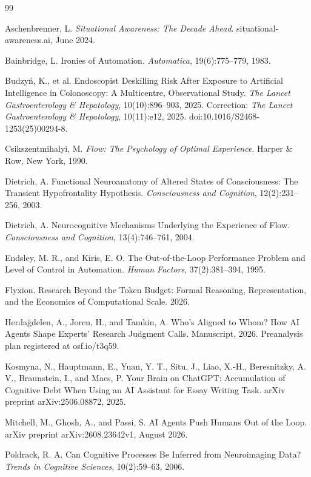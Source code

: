\documentclass[11pt]{article}
\begin{document}
\begin{thebibliography}{99}

 Aschenbrenner, L. \emph{Situational Awareness: The Decade Ahead}. situational-awareness.ai, June 2024.

 Bainbridge, L. Ironies of Automation. \emph{Automatica}, 19(6):775--779, 1983.

 Budzy\'n, K., et al. Endoscopist Deskilling Risk After Exposure to Artificial Intelligence in Colonoscopy: A Multicentre, Observational Study. \emph{The Lancet Gastroenterology \& Hepatology}, 10(10):896--903, 2025. Correction: \emph{The Lancet Gastroenterology \& Hepatology}, 10(11):e12, 2025. doi:10.1016/S2468-1253(25)00294-8.

 Csikszentmihalyi, M. \emph{Flow: The Psychology of Optimal Experience}. Harper \& Row, New York, 1990.

 Dietrich, A. Functional Neuroanatomy of Altered States of Consciousness: The Transient Hypofrontality Hypothesis. \emph{Consciousness and Cognition}, 12(2):231--256, 2003.

 Dietrich, A. Neurocognitive Mechanisms Underlying the Experience of Flow. \emph{Consciousness and Cognition}, 13(4):746--761, 2004.

 Endsley, M. R., and Kiris, E. O. The Out-of-the-Loop Performance Problem and Level of Control in Automation. \emph{Human Factors}, 37(2):381--394, 1995.

 Flyxion. Research Beyond the Token Budget: Formal Reasoning, Representation, and the Economics of Computational Scale. 2026.

 Herdağdelen, A., Joren, H., and Tamkin, A. Who's Aligned to Whom? How AI Agents Shape Experts' Research Judgment Calls. Manuscript, 2026. Preanalysis plan registered at osf.io/t3q59.

 Kosmyna, N., Hauptmann, E., Yuan, Y. T., Situ, J., Liao, X.-H., Beresnitzky, A. V., Braunstein, I., and Maes, P. Your Brain on ChatGPT: Accumulation of Cognitive Debt When Using an AI Assistant for Essay Writing Task. arXiv preprint arXiv:2506.08872, 2025.

 Mitchell, M., Ghosh, A., and Passi, S. AI Agents Push Humans Out of the Loop. arXiv preprint arXiv:2608.23642v1, August 2026.

 Poldrack, R. A. Can Cognitive Processes Be Inferred from Neuroimaging Data? \emph{Trends in Cognitive Sciences}, 10(2):59--63, 2006.


\end{thebibliography}
\end{document}
